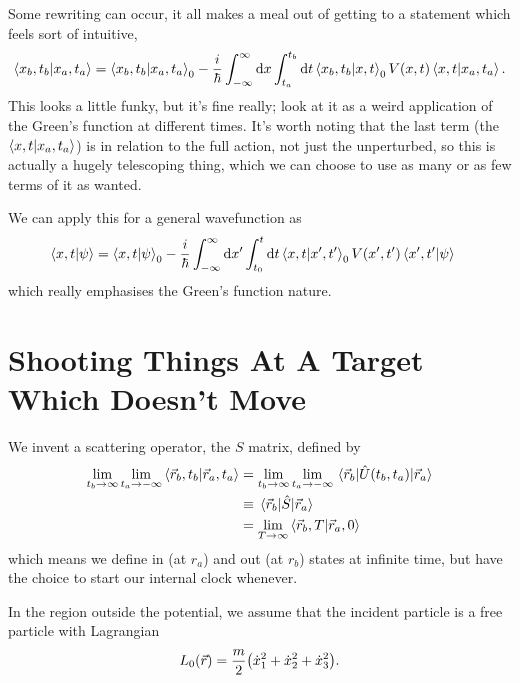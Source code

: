 \documentclass[]{revision-notes}
\begin{document}
Some rewriting can occur, it all makes a meal out of getting to a statement which feels sort of intuitive, \begin{equation*}
  \braket{x_b, t_b}{x_a, t_a} = \braket{x_b, t_b}{x_a, t_a}_0  - \frac{i}{\hbar} \int_{-\infty}^\infty \dd{x} \int_{t_a}^{t_b} \dd{t} \braket{x_b, t_b}{x, t}_0 V(x, t) \braket{x, t}{x_a, t_a}.
\end{equation*}
This looks a little funky, but it's fine really; look at it as a weird application of the Green's function at different times.
It's worth noting that the last term (the \( \braket{x, t}{x_a, t_a}\)) is in relation to the full action, not just the unperturbed, so this is actually a hugely telescoping thing, which we can choose to use as many or as few terms of it as wanted.

We can apply this for a general wavefunction as
\begin{align*}
  \braket{x, t}{\psi} &= \braket{x, t}{\psi}_0 - \frac{i}{\hbar}\int_{-\infty}^\infty \dd{x^\prime} \int_{t_0}^t \dd{t} \braket{x, t}{x^\prime, t^\prime}_0 V(x^\prime, t^\prime) \braket{x^\prime, t^\prime}{\psi}
\end{align*}
which really emphasises the Green's function nature.

\section{Shooting Things At A Target Which Doesn't Move}
We invent a scattering operator, the \(S\) matrix, defined by
\begin{align*}
  \lim_{t_b \to \infty} \lim_{t_a \to -\infty} \braket{\vec{r}_b, t_b}{\vec{r}_a, t_a} &=   \lim_{t_b \to \infty} \lim_{t_a \to -\infty} \mel{\vec{r}_b}{\hat{U}(t_b, t_a)}{\vec{r}_a}\\
  &\equiv \mel{\vec{r}_b}{\hat{S}}{\vec{r}_a}\\
  &= \lim_{T \to \infty} \braket{\vec{r}_b, T}{\vec{r}_a, 0}
\end{align*}
which means we define in (at \( r_a \)) and out (at \( r_b \)) states at infinite time, but have the choice to start our internal clock whenever.

In the region outside the potential, we assume that the incident particle is a free particle with Lagrangian \[L_0 (\vec{r}) = \frac{m}{2} \qty(\dot{x}_1^2 + \dot{x}_2^2 + \dot{x}_3^2).\]
\end{document}
